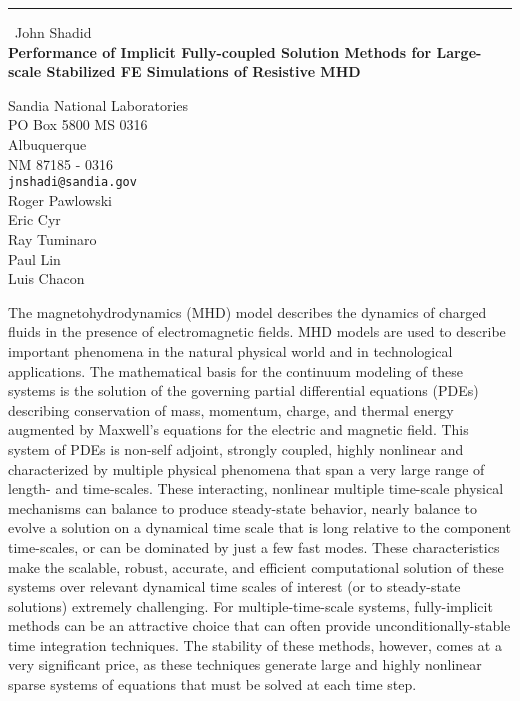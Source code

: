 \documentclass{report}
\begin{document}
\begin{center}
\rule{6in}{1pt} \
{\large John Shadid \\
{\bf Performance of Implicit Fully-coupled Solution Methods for Large-scale Stabilized FE Simulations of Resistive MHD }}

Sandia National Laboratories \\ PO Box 5800 MS 0316 \\ Albuquerque \\ NM 87185 - 0316
\\
{\tt jnshadi@sandia.gov}\\
Roger Pawlowski\\
Eric Cyr\\
Ray Tuminaro\\
Paul Lin\\
Luis Chacon\end{center}

The magnetohydrodynamics (MHD) model describes the dynamics of charged
fluids in the presence of electromagnetic fields. MHD models are used to
describe important phenomena in the natural physical world and in
technological applications. The mathematical basis for the continuum
modeling of these systems is the solution of the governing partial
differential equations (PDEs) describing conservation of mass, momentum,
charge, and thermal energy augmented by Maxwell's equations for the
electric and magnetic field. This system of PDEs is non-self adjoint,
strongly coupled, highly nonlinear and characterized by multiple physical
phenomena that span a very large range of length- and time-scales. These
interacting, nonlinear multiple time-scale physical mechanisms can
balance to produce steady-state behavior, nearly balance to evolve a
solution on a dynamical time scale that is long relative to the component
time-scales, or can be dominated by just a few fast modes. These
characteristics make the scalable, robust, accurate, and efficient
computational solution of these systems over relevant dynamical time
scales of interest (or to steady-state solutions) extremely challenging.
For multiple-time-scale systems, fully-implicit methods can be an
attractive choice that can often provide unconditionally-stable time
integration techniques. The stability of these methods, however, comes at
a very significant price, as these techniques generate large and highly
nonlinear sparse systems of equations that must be solved at each time
step.
\end{document}
